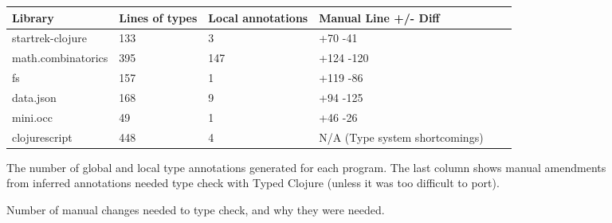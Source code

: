 \begin{figure*}
\begin{tabular}{| l | l | l | l | l | l |}
  Library            & Lines of types  & Local annotations & Manual Line +/- Diff \\
  \hline
  startrek-clojure   & 133             & 3                 & +70 -41 \\
  math.combinatorics & 395             & 147               & +124 -120\\
  fs                 & 157             & 1                 & +119 -86\\
  data.json          & 168             & 9                 & +94 -125 \\
  mini.occ           & 49              & 1                 & +46 -26\\
  clojurescript      & 448             & 4                 & N/A (Type system shortcomings)\\
\end{tabular}
\caption{The number of global and local type annotations generated for each program.
  The last column shows manual amendments from inferred annotations needed
  type check with Typed Clojure (unless it was too difficult to port).
  }
\caption{
  Number of manual changes needed to type check, and why they were needed.
  }
  \label{infer:fig:gentype}
\end{figure*}

